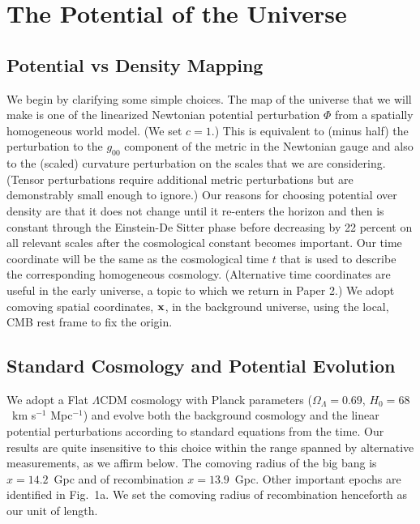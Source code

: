 \documentclass[useAMS,usenatbib,a4paper]{mn2e}
\begin{document}
\section{The Potential of the Universe}
\subsection{Potential vs Density Mapping}
We begin by clarifying some simple choices. The map of the universe that we will make is one of the linearized Newtonian potential perturbation $\Phi$ from a spatially homogeneous world model. (We set $c=1$.) This is equivalent to (minus half) the perturbation to the $g_{00}$ component of the metric in the Newtonian gauge and also to the (scaled) curvature perturbation on the scales that we are considering. (Tensor perturbations require additional metric perturbations but are demonstrably small enough to ignore.) Our reasons for choosing potential over density are that it does not change until it re-enters the horizon and then is constant through the Einstein-De Sitter phase before decreasing by 22 percent on all relevant scales after the cosmological constant becomes important. Our time coordinate will be the same as the cosmological time $t$ that is used to describe the corresponding homogeneous cosmology. (Alternative time coordinates are useful in the early universe, a topic to which we return in Paper 2.) We adopt comoving spatial coordinates, $\bf x$, in the background universe, using the local, CMB rest frame to fix the origin. 
\subsection{Standard Cosmology and Potential Evolution}
We adopt a Flat $\Lambda$CDM cosmology with Planck parameters ($\Omega_\Lambda=0.69$, $H_0=68$~km s$^{-1}$ Mpc$^{-1}$) and evolve both the background cosmology and the linear potential perturbations according to standard equations from the time. Our results are quite insensitive to this choice within the range spanned by alternative measurements, as we affirm below. The comoving radius of the big bang is $x=14.2$~Gpc and of recombination $x=13.9$~Gpc. Other important epochs are identified in Fig.~1a. We set the comoving radius of recombination henceforth as our unit of length.
\end{document}
